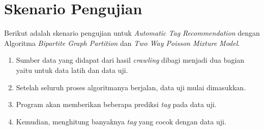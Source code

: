 
\section{Skenario Pengujian}

Berikut adalah skenario pengujian untuk \textit{Automatic Tag Recommendation} dengan Algoritma \textit{Bipartite Graph Partition} dan \textit{Two Way Poisson Mixture Model}.

\begin{enumerate}
    \item Sumber data yang didapat dari hasil \textit{crawling} dibagi menjadi dua bagian yaitu untuk data latih dan data uji.
    \item Setelah seluruh proses algoritmanya berjalan, data uji mulai dimasukkan.
    \item Program akan memberikan beberapa prediksi \textit{tag} pada data uji.
    \item Kemudian, menghitung banyaknya \textit{tag} yang cocok dengan data uji. 
\end{enumerate}
